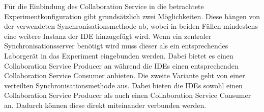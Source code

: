 Für die Einbindung des Collaboration Service in die betrachtete Experimentkonfiguration gibt grundsätzlich zwei Möglichkeiten. Diese hängen von der verwendeten Synchronisationsmethode ab, wobei in beiden Fällen mindestens eine weitere Instanz der IDE hinzugefügt wird. Wenn ein zentraler Synchronisationsserver benötigt wird muss dieser als ein entsprechendes Laborgerät in das Experiment eingebunden werden. Dabei bietet es einen Collaboration Service Producer an während die IDEs einen entsprechenden Collaboration Service Consumer anbieten. Die zweite Variante geht von einer verteilten Synchronisationsmethode aus. Dabei bieten die IDEs sowohl einen Collaboration Service Producer als auch einen Collaboration Service Consumer an. Dadurch können diese direkt miteinander verbunden werden.